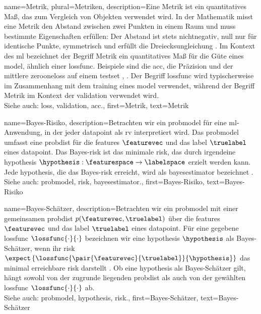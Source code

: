 {{{{
{name={Metrik}, plural={Metriken},
	description={Eine Metrik ist ein quantitatives Maß, das zum Vergleich von Objekten verwendet wird. 
	In der Mathematik misst eine Metrik den Abstand zwischen zwei Punkten in einem Raum und 
	muss bestimmte Eigenschaften erfüllen: Der Abstand ist stets nichtnegativ, null nur für identische Punkte, 
	symmetrisch und erfüllt die Dreiecksungleichung \cite{RudinBookPrinciplesMatheAnalysis}. 
	Im Kontext des \gls{ml} bezeichnet der Begriff Metrik ein quantitatives Maß für die Güte eines \gls{model}, 
	ähnlich einer \gls{lossfunc}. Beispiele sind die \gls{acc}, die Präzision und der mittlere 
	\gls{zerooneloss} auf einem \gls{testset} \cite{Goodfellow-et-al-2016}, \cite{BishopBook}. 
	Der Begriff \gls{lossfunc} wird typischerweise im Zusammenhang mit dem \gls{training} eines \gls{model} verwendet, 
	während der Begriff Metrik im Kontext der \gls{validation} verwendet wird.
	\\ 
	Siehe auch: \gls{loss}, \gls{validation}, \gls{acc}.},
	first={Metrik}, 
	text={Metrik}
}

{name={Bayes-Risiko},
	description={Betrachten wir ein \gls{probmodel} für eine \gls{ml}-Anwendung, 
	in der jeder \gls{datapoint} als \gls{rv} interpretiert wird. 
	Das \gls{probmodel} umfasst eine \gls{probdist} für die \glspl{feature} $\featurevec$ 
	und das \gls{label} $\truelabel$ eines \gls{datapoint}. 
	Das Bayes-\gls{risk} ist das minimale \gls{risk}, 
	das durch irgendeine \gls{hypothesis} $\hypothesis: \featurespace \rightarrow \labelspace$ 
	erzielt werden kann. 
	Jede \gls{hypothesis}, die das Bayes-\gls{risk} erreicht, wird als \gls{bayesestimator} bezeichnet \cite{LC}.
	\\
	Siehe auch: \gls{probmodel}, \gls{risk}, \gls{bayesestimator}.},
	first={Bayes-Risiko},
	text={Bayes-Risiko}
}
	
{name={Bayes-Schätzer},
	description={Betrachten wir ein \gls{probmodel} mit einer gemeinsamen \gls{probdist} 
	$p(\featurevec,\truelabel)$ über die \glspl{feature} $\featurevec$ und das \gls{label} $\truelabel$ 
	eines \gls{datapoint}. Für eine gegebene \gls{lossfunc} $\lossfunc{\cdot}{\cdot}$ 
	bezeichnen wir eine \gls{hypothesis} $\hypothesis$ als Bayes-Schätzer, 
	wenn ihr \gls{risk} 
	$\expect\left\{\lossfunc{\pair{\featurevec}{\truelabel}}{\hypothesis}\right\}$
	das minimal erreichbare \gls{risk} darstellt \cite{LC}. 
	Ob eine \gls{hypothesis} als Bayes-Schätzer gilt, hängt sowohl von der zugrunde liegenden \gls{probdist} 
	als auch von der gewählten \gls{lossfunc} $\lossfunc{\cdot}{\cdot}$ ab.
	\\
	Siehe auch: \gls{probmodel}, \gls{hypothesis}, \gls{risk}.},
	first={Bayes-Schätzer},
	text={Bayes-Schätzer}
}

}}}}
